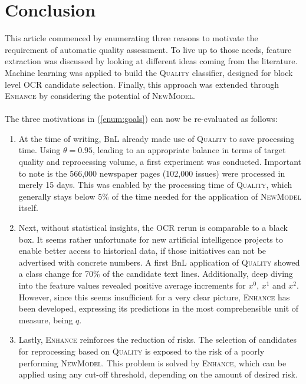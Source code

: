 \documentclass{jdmdh}
\begin{document}
\section{Conclusion}
This article commenced by enumerating three reasons to motivate the requirement of automatic quality assessment. To live up to those needs, feature extraction was discussed by looking at different ideas coming from the literature. Machine learning was applied to build the \textsc{Quality} classifier, designed for block level OCR candidate selection. Finally, this approach was extended through \textsc{Enhance} by considering the potential of \textsc{NewModel}.
\\ \\
The three motivations in (\ref{enum:goals}) can now be re-evaluated as follows: \\
\begin{enumerate}
    \item At the time of writing, BnL already made use of \textsc{Quality} to save processing time. Using $\theta\!=\!0.95$, leading to an appropriate balance in terms of target quality and reprocessing volume, a first experiment was conducted.
    Important to note is the 566,000 newspaper pages (102,000 issues) were processed in merely 15 days. This was enabled by the processing time of \textsc{Quality}, which generally stays below $5\%$ of the time needed for the application of \textsc{NewModel} itself. \\
    \item Next, without statistical insights, the OCR rerun is comparable to a black box. It seems rather unfortunate for new artificial intelligence projects to enable better access to historical data, if those initiatives can not be advertised with concrete numbers. A first BnL application of \textsc{Quality} showed a class change for 70\% of the candidate text lines. Additionally, deep diving into the feature values revealed positive average increments for $x^0$, $x^1$ and $x^2$. However, since this seems insufficient for a very clear picture, \textsc{Enhance} has been developed, expressing its predictions in the most comprehensible unit of measure, being $q$. \\
    \item Lastly, \textsc{Enhance} reinforces the reduction of risks. The selection of candidates for reprocessing based on \textsc{Quality} is exposed to the risk of a poorly performing \textsc{NewModel}. This problem is solved by \textsc{Enhance}, which can be applied using any cut-off threshold, depending on the amount of desired risk. \\
\end{enumerate}
\end{document}
